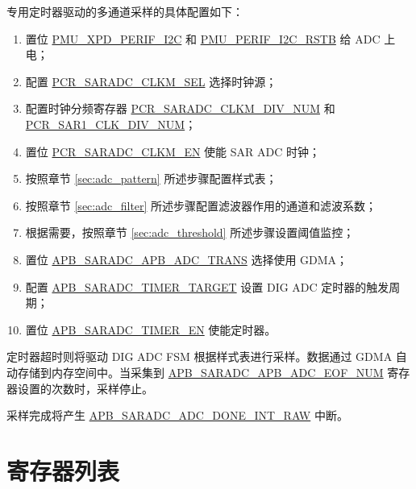 \documentclass[main\_\_CN.tex]{subfiles}
\begin{document}
专用定时器驱动的多通道采样的具体配置如下：
\begin{enumerate}
    \item 置位 \hyperref[fielddesc:PMUXPDPERIFI2C]{PMU\_XPD\_PERIF\_I2C} 和 \hyperref[fielddesc:PMUPERIFI2CRSTB]{PMU\_PERIF\_I2C\_RSTB} 给 ADC 上电；
    \item 配置 \hyperref[fielddesc:PCRSARADCCLKMSEL]{PCR\_SARADC\_CLKM\_SEL} 选择时钟源；
    \item 配置时钟分频寄存器 \hyperref[fielddesc:PCRSARADCCLKMDIVNUM]{PCR\_SARADC\_CLKM\_DIV\_NUM} 和 \hyperref[fielddesc:PCRSAR1CLKDIVNUM]{PCR\_SAR1\_CLK\_DIV\_NUM}；
    \item 置位 \hyperref[fielddesc:PCRSARADCCLKMEN]{PCR\_SARADC\_CLKM\_EN} 使能 SAR ADC 时钟；
    \item 按照章节 \ref{sec:adc_pattern} \textit{} 所述步骤配置样式表；
    \item 按照章节 \ref{sec:adc_filter} \textit{} 所述步骤配置滤波器作用的通道和滤波系数；
    \item 根据需要，按照章节 \ref{sec:adc_threshold} \textit{} 所述步骤设置阈值监控；
    \item 置位 \hyperref[fielddesc:APBSARADCAPBADCTRANS]{APB\_SARADC\_APB\_ADC\_TRANS} 选择使用 GDMA；
    \item 配置 \hyperref[fielddesc:APBSARADCTIMERTARGET]{APB\_SARADC\_TIMER\_TARGET} 设置 DIG ADC 定时器的触发周期；
    \item 置位 \hyperref[fielddesc:APBSARADCTIMEREN]{APB\_SARADC\_TIMER\_EN} 使能定时器。
\end{enumerate}

定时器超时则将驱动 DIG ADC FSM 根据样式表进行采样。数据通过 GDMA 自动存储到内存空间中。当采集到 \hyperref[fielddesc:APBSARADCAPBADCEOFNUM]{APB\_SARADC\_APB\_ADC\_EOF\_NUM} 寄存器设置的次数时，采样停止。


采样完成将产生 \hyperref[fielddesc:APBSARADCDONEINTRAW]{APB\_SARADC\_ADC\_DONE\_INT\_RAW} 中断。





\newpage
\hypertarget{adc-reg-summ}{}
\section{寄存器列表}
\label{sec:adc-reg-summ}
\end{document}
